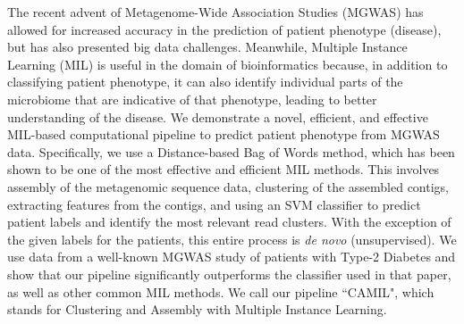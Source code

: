 
The recent advent of Metagenome-Wide Association Studies (MGWAS) has allowed for increased accuracy in the prediction of patient phenotype (disease), but has also presented big data challenges. Meanwhile, Multiple Instance Learning (MIL) is useful in the domain of bioinformatics because, in addition to classifying patient phenotype, it can also identify individual parts of the microbiome that are indicative of that phenotype, leading to better understanding of the disease. We demonstrate a novel, efficient, and effective MIL-based computational pipeline to predict patient phenotype from MGWAS data. Specifically, we use a Distance-based Bag of Words method, which has been shown to be one of the most effective and efficient MIL methods. This involves assembly of the metagenomic sequence data, clustering of the assembled contigs, extracting features from the contigs, and using an SVM classifier to predict patient labels and identify the most relevant read clusters. With the exception of the given labels for the patients, this entire process is \emph{de novo} (unsupervised). We use data from a well-known MGWAS study of patients with Type-2 Diabetes and show that our pipeline significantly outperforms the classifier used in that paper, as well as other common MIL methods. We call our pipeline ``CAMIL", which stands for Clustering and Assembly with Multiple Instance Learning.
